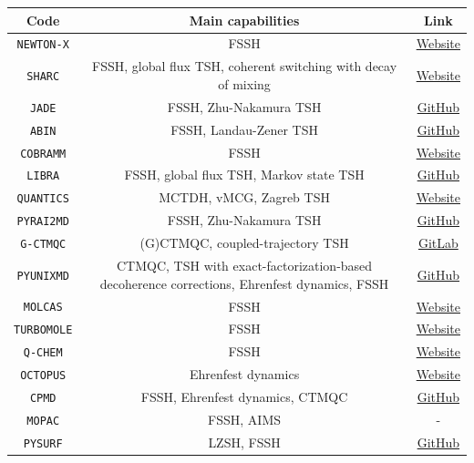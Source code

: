 \documentclass[9pt,bestpractices,pubversion]{livecoms}
\begin{document}
\begin{table}[h!]
    \centering
    \begin{tabular}{|c|c|c|}
    \hline 
    \textbf{Code}  & \textbf{Main capabilities} & \textbf{Link} \\ 
    \hline
      \texttt{NEWTON-X} & FSSH  & \href{https://newtonx.org}{Website} \\
      \texttt{SHARC}   & FSSH, global flux TSH, coherent switching with decay of mixing & \href{https://sharc-md.org}{Website}\\
      \texttt{JADE}   & FSSH, Zhu-Nakamura TSH & \href{https://github.com/zglan/JADE-NAMD}{GitHub}\\
      \texttt{ABIN}   & FSSH, Landau-Zener TSH & \href{https://github.com/PHOTOX/ABIN}{GitHub} \\
      \texttt{COBRAMM} & FSSH  & \href{https://site.unibo.it/cobramm/en}{Website} \\
      \texttt{LIBRA} & FSSH,  global flux TSH, Markov state TSH  & \href{https://github.com/Quantum-Dynamics-Hub/Libra-X}{GitHub} \\
      \texttt{QUANTICS} & MCTDH, vMCG, Zagreb TSH & \href{https://www.chem.ucl.ac.uk/quantics/}{Website} \\
    \texttt{PYRAI2MD} & FSSH, Zhu-Nakamura TSH  & \href{https://github.com/mlcclab/PyRAI2MD-hiam}{GitHub} \\   
          \texttt{G-CTMQC} & (G)CTMQC, coupled-trajectory TSH & \href{https://gitlab.com/agostini.work/g-ctmqc}{GitLab} \\
        \texttt{PYUNIXMD} & CTMQC, TSH with exact-factorization-based decoherence corrections, Ehrenfest dynamics, FSSH & \href{https://github.com/skmin-lab/unixmd}{GitHub} \\
       \texttt{MOLCAS} & FSSH & \href{https://www.molcas.org}{Website} \\
        \texttt{TURBOMOLE} & FSSH & \href{https://www.turbomole.org}{Website} \\
        \texttt{Q-CHEM} & FSSH & \href{http://www.q-chem.com}{Website} \\
        \texttt{OCTOPUS} & Ehrenfest dynamics  & \href{https://octopus-code.org/documentation/16/}{Website} \\
        \texttt{CPMD} & FSSH, Ehrenfest dynamics, CTMQC  & \href{https://github.com/CPMD-code}{GitHub} \\
                \texttt{MOPAC}  & FSSH, AIMS & -  \\
        \texttt{PYSURF} & LZSH, FSSH & \href{https://github.com/MFSJMenger/pysurf}{GitHub} \\

\end{tabular}
\end{table}
\end{document}
